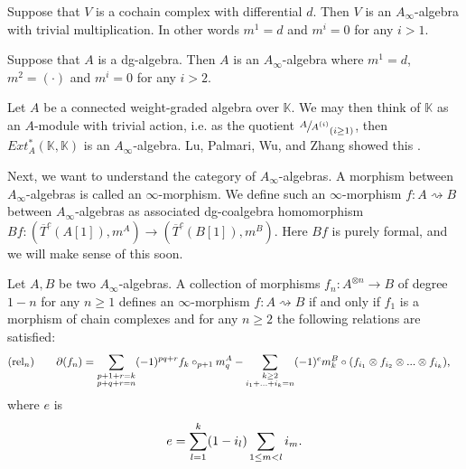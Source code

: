 \documentclass[../thesis.tex]{subfiles}
\begin{document}
        \begin{example}
            Suppose that $V$ is a cochain complex with differential $d$. Then $V$ is an $A_\infty$-algebra with trivial multiplication. In other words $m^1 = d$ and $m^i = 0$ for any $i>1$.
        \end{example}

        \begin{example}
            Suppose that $A$ is a dg-algebra. Then $A$ is an $A_\infty$-algebra where $m^1 = d$, $m^2 = (\cdot)$ and $m^i=0$ for any $i>2$.
        \end{example}

        \begin{example}
            Let $A$ be a connected weight-graded algebra over $\mathbb{K}$. We may then think of $\mathbb{K}$ as an $A$-module with trivial action, i.e. as the quotient $\sfrac{A}{A^{(i)}}_{(i\geq 1)}$, then $Ext^*_A(\mathbb{K},\mathbb{K})$ is an $A_\infty$-algebra. Lu, Palmari, Wu, and Zhang showed this \cite{Lu06}.
        \end{example}

        Next, we want to understand the category of $A_\infty$-algebras. A morphism between $A_\infty$-algebras is called an $\infty$-morphism. We define such an $\infty$-morphism $f:A\rightsquigarrow B$ between $A_\infty$-algebras as associated dg-coalgebra homomorphism $Bf:(\overline{T}^c(A[1]), m^A)\rightarrow (\overline{T}^c(B[1]), m^B)$. Here $Bf$ is purely formal, and we will make sense of this soon.

        \begin{proposition}
            Let $A,B$ be two $A_\infty$-algebras. A collection of morphisms $f_n : A^{\otimes n} \rightarrow B$ of degree $1-n$ for any $n \geq 1$ defines an $\infty$-morphism $f : A \rightsquigarrow B$ if and only if $f_1$ is a morphism of chain complexes and for any $n\geq 2$ the following relations are satisfied:
            \begin{align*}
                & (\text{rel}_n)\qquad \partial(f_n) = \sum_{\substack{p + 1 + r = k \\ p + q + r = n}}(-1)^{pq+r}f_k\circ_{p+1}m^A_q - \sum_{\substack{k\geq 2 \\ i_1 + ... + i_k = n}}(-1)^{e}m^B_k \circ (f_{i_1}\otimes f_{i_2}\otimes ... \otimes f_{i_k})\tt{,}
            \end{align*}
            where $e$ is
            \begin{align*}
                e = \sum_{l = 1}^k(1-i_l)\sum_{1\leq m < l}i_m\tt{.}
            \end{align*}
        \end{proposition}
        
\end{document}
